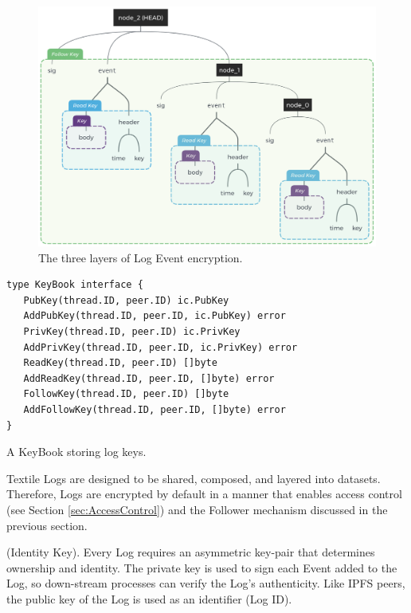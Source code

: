 \documentclass{comjnl}
\begin{document}
\begin{figure}
\centering
\begin{minipage}{0.6\textwidth}
  \includegraphics[width=\linewidth]{figures/Event_Log_With_Encryption.png}
  \caption{The three layers of Log Event encryption.}
  \label{fig:LogEncryption}
  \end{minipage}
\end{figure}

\begin{example}
\begin{lstlisting}
type KeyBook interface {
   PubKey(thread.ID, peer.ID) ic.PubKey
   AddPubKey(thread.ID, peer.ID, ic.PubKey) error
   PrivKey(thread.ID, peer.ID) ic.PrivKey
   AddPrivKey(thread.ID, peer.ID, ic.PrivKey) error
   ReadKey(thread.ID, peer.ID) []byte
   AddReadKey(thread.ID, peer.ID, []byte) error
   FollowKey(thread.ID, peer.ID) []byte
   AddFollowKey(thread.ID, peer.ID, []byte) error
}
\end{lstlisting}
\caption{A KeyBook storing log keys.}
\end{example} \label{ex:KeyBook}


Textile Logs are designed to be shared, composed, and layered into datasets. Therefore, Logs are encrypted by default in a manner that enables access control (see Section  \ref{sec:AccessControl}) and the Follower mechanism discussed in the previous section.

\begin{definition}
(Identity Key). Every Log requires an asymmetric key-pair that determines ownership and identity. The private key is used to sign each Event added to the Log, so down-stream processes can verify the Log’s authenticity. Like IPFS peers, the public key of the Log is used as an identifier (Log ID).
\end{definition}
\end{document}
